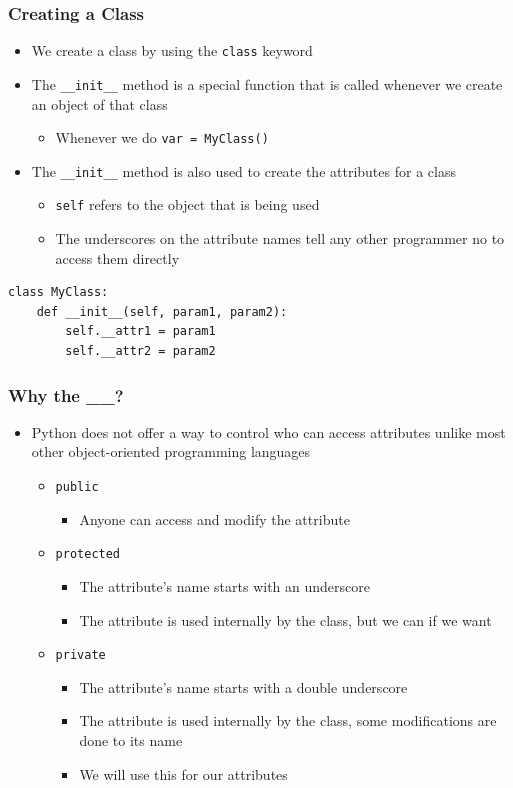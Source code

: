 \documentclass[11pt]{beamer}
\begin{document}
\begin{frame}[fragile]\frametitle{Creating a Class}
\begin{itemize}
\item We create a class by using the \lstinline|class| keyword
\item The \lstinline|__init__| method is a special function that is called whenever we create an object of that class
    \begin{itemize}
    \item Whenever we do \lstinline|var = MyClass()|
    \end{itemize}
\item The \lstinline|__init__| method is also used to create the attributes for a class
    \begin{itemize}
    \item \lstinline|self| refers to the object that is being used
    \item The underscores on the attribute names tell any other programmer no to access them directly
    \end{itemize}
\end{itemize}
\begin{lstlisting}
class MyClass:
    def __init__(self, param1, param2):
        self.__attr1 = param1
        self.__attr2 = param2
\end{lstlisting}
\end{frame}


\begin{frame}[fragile]\frametitle{Why the \_\_?}
\begin{itemize}
\item Python does not offer a way to control who can access attributes unlike most other object-oriented programming languages
    \begin{itemize}
    \item \texttt{public}
        \begin{itemize}
        \item Anyone can access and modify the attribute
        \end{itemize}
    \item \texttt{protected}
        \begin{itemize}
        \item The attribute's name starts with an underscore
        \item The attribute is used internally by the class, but we can if we want
        \end{itemize}
    \item \texttt{private}
        \begin{itemize}
        \item The attribute's name starts with a double underscore
        \item The attribute is used internally by the class, some modifications are done to its name
        \item We will use this for our attributes
        \end{itemize}
    \end{itemize}
\end{itemize}
\end{frame}
\end{document}
